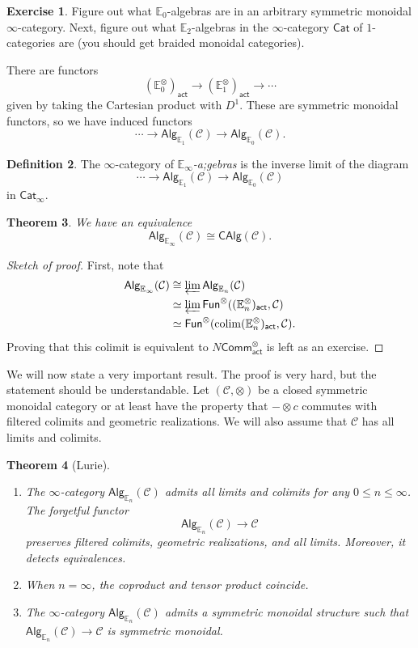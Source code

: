 \documentclass[10pt, oneside]{memoir}
\newtheorem{thm}{Theorem}[subsection]
\theoremstyle{definition}
\newtheorem{defn}[thm]{Definition}
\newtheorem{exer}[thm]{Exercise}
\theoremstyle{remark}
\theoremstyle{plain}
\theoremstyle{definition}
\theoremstyle{remark}
\newcommand{\E}{\mathbb{E}}
\newcommand{\mc}[1]{\mathcal{#1}}
\newcommand{\ms}[1]{\mathsf{#1}}
\newcommand{\1}{\mathbf{1}}
\newcommand{\2}{\mathbf{2}}
\newcommand{\3}{\mathbf{3}}
\DeclareMathOperator*{\colim}{colim}
\begin{document}
\begin{exer}
    Figure out what $\E_0$-algebras are in an arbitrary symmetric monoidal $\infty$-category. Next, figure out what $\E_2$-algebras in the $\infty$-category $\ms{Cat}$ of $1$-categories are (you should get braided monoidal categories).
\end{exer}

There are functors
\[ (\E_0^{\otimes})_{\ms{act}} \to (\E_1^{\otimes})_{\ms{act}} \to \cdots \]
given by taking the Cartesian product with $D^1$. These are symmetric monoidal functors, so we have induced functors
\[ \cdots \to \ms{Alg}_{\E_1}(\mc{C}) \to \ms{Alg}_{\E_0}(\mc{C}). \]

\begin{defn}
    The $\infty$-category of \textit{$\E_{\infty}$-a;gebras} is the inverse limit of the diagram
    \[ \cdots \to \ms{Alg}_{\E_1}(\mc{C}) \to \ms{Alg}_{\E_0}(\mc{C}) \]
    in $\ms{Cat}_{\infty}$.
\end{defn}

\begin{thm}
    We have an equivalence
    \[ \ms{Alg}_{\E_{\infty}}(\mc{C}) \cong \ms{CAlg}(\mc{C}). \]
\end{thm}

\begin{proof}[Sketch of proof]
    First, note that
    \begin{align*}
        \ms{Alg}_{\E_{\infty}}(\mc{C}) &\cong \varprojlim \ms{Alg}_{\E_n}(\mc{C}) \\
        &\simeq \varprojlim \ms{Fun}^{\otimes}((\E_n^{\otimes})_{\ms{act}}, \mc{C}) \\
        &\simeq \ms{Fun}^{\otimes} (\colim (\E_n^{\otimes})_{\ms{act}}, \mc{C}).
    \end{align*}
    Proving that this colimit is equivalent to $N \ms{Comm}_{\ms{act}}^{\otimes}$ is left as an exercise.
\end{proof}

We will now state a very important result. The proof is very hard, but the statement should be understandable. Let $(\mc{C}, \otimes)$ be a closed symmetric monoidal category or at least have the property that $-\otimes c$ commutes with filtered colimits and geometric realizations. We will also assume that $\mc{C}$ has all limits and colimits.

\begin{thm}[Lurie]\leavevmode
    \begin{enumerate}
        \item The $\infty$-category $\ms{Alg}_{\E_n}(\mc{C})$ admits all limits and colimits for any $0 \leq n \leq \infty$. The forgetful functor
        \[ \ms{Alg}_{\E_n}(\mc{C}) \to \mc{C} \]
        preserves filtered colimits, geometric realizations, and all limits. Moreover, it detects equivalences.
        \item When $n = \infty$, the coproduct and tensor product coincide.
        \item The $\infty$-category $\ms{Alg}_{\E_n}(\mc{C})$ admits a symmetric monoidal structure such that $\ms{Alg}_{\E_n}(\mc{C}) \to \mc{C}$ is symmetric monoidal.
    \end{enumerate}
\end{thm}
\end{document}
